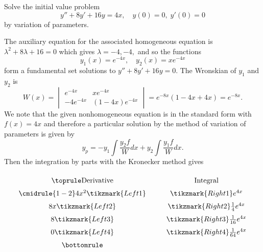 \begin{example}\label{ex:3-3-1}
Solve the initial value problem \[y'' + 8 y' + 16 y = 4 x,\quad  y(0) = 0,\; y'(0) = 0\] by variation of parameters.
\end{example}
\begin{solution}
		The auxiliary equation for the associated homogeneous equation is
		\(\lambda^2 + 8\lambda + 16 = 0\) which gives
		\(\lambda = -4, -4,\)
and so the functions
		\[
		y_1(x) = e^{-4x}, \quad y_2(x) = x e^{-4x}
		\]
		form a fundamental set solutions to \(y'' + 8 y' + 16 y=0.\)
		The Wronskian of \(y_1\) and \(y_2\) is
		\[
		W(x) = 
		\begin{vmatrix}
			e^{-4x} & x e^{-4x} \\ 
			-4 e^{-4x} & (1 - 4x) e^{-4x}
		\end{vmatrix}
		= e^{-8x} (1 - 4x + 4x) = e^{-8x}.
		\]
		We note that the given nonhomogeneous equation is in the standard form with \(f(x)  = 4x\)  and therefore a particular solution by the method of variation of parameters is given by
		\[
		y_p = -y_1 \int \frac{y_2 f}{W} dx + y_2 \int \frac{y_1 f}{W} dx.
		\]
		Then  the integration by parts with  the Kronecker method gives	
		
%
%
%
		
		
		
		\[
		\renewcommand{\arraystretch}{1.5}
		\begin{array}{c @{\hspace*{1.0cm}} c}\toprule
			\text{Derivative} &  \text{Integral} \\\cmidrule{1-2}
			4x^2\tikzmark{Left 1} & \tikzmark{Right 1}e^{4x} \\
			8x \tikzmark{Left 2} & \tikzmark{Right 2}\frac{1}{4} e^{4x} \\      
			8  \tikzmark{Left 3} & \tikzmark{Right 3}\frac{1}{16} e^{4x} \\      
			0  \tikzmark{Left 4} & \tikzmark{Right 4}\frac{1}{64} e^{4x} \\\bottomrule
		\end{array}
		\]


\end{solution}
